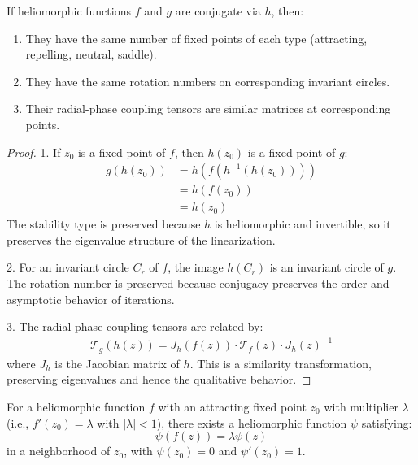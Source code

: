 \begin{theorem}
If heliomorphic functions $f$ and $g$ are conjugate via $h$, then:
\begin{enumerate}
    \item They have the same number of fixed points of each type (attracting, repelling, neutral, saddle).
    \item They have the same rotation numbers on corresponding invariant circles.
    \item Their radial-phase coupling tensors are similar matrices at corresponding points.
\end{enumerate}
\end{theorem}

\begin{proof}
1. If $z_0$ is a fixed point of $f$, then $h(z_0)$ is a fixed point of $g$:
\begin{align}
g(h(z_0)) &= h(f(h^{-1}(h(z_0))))\\
&= h(f(z_0))\\
&= h(z_0)
\end{align}
The stability type is preserved because $h$ is heliomorphic and invertible, so it preserves the eigenvalue structure of the linearization.

2. For an invariant circle $C_r$ of $f$, the image $h(C_r)$ is an invariant circle of $g$. The rotation number is preserved because conjugacy preserves the order and asymptotic behavior of iterations.

3. The radial-phase coupling tensors are related by:
\begin{align}
\mathcal{T}_g(h(z)) = J_h(f(z)) \cdot \mathcal{T}_f(z) \cdot J_h(z)^{-1}
\end{align}
where $J_h$ is the Jacobian matrix of $h$. This is a similarity transformation, preserving eigenvalues and hence the qualitative behavior.
\end{proof}

\begin{theorem}
For a heliomorphic function $f$ with an attracting fixed point $z_0$ with multiplier $\lambda$ (i.e., $f'(z_0) = \lambda$ with $|\lambda| < 1$), there exists a heliomorphic function $\psi$ satisfying:
\begin{equation}
\psi(f(z)) = \lambda \psi(z)
\end{equation}
in a neighborhood of $z_0$, with $\psi(z_0) = 0$ and $\psi'(z_0) = 1$.
\end{theorem}

